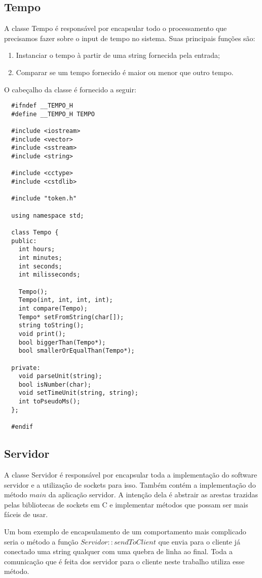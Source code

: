 \documentclass[12pt]{article}
\begin{document}
\subsection{Tempo}
A classe Tempo é responsável por encapsular todo o processamento que precisamos
fazer sobre o input de tempo no sistema. Suas principais funções são:

\begin{enumerate}
  \item Instanciar o tempo à partir de uma string fornecida pela entrada;
  \item Comparar se um tempo fornecido é maior ou menor que outro tempo.
\end{enumerate}

O cabeçalho da classe é fornecido a seguir:

\begin{verbatim}
  #ifndef __TEMPO_H
  #define __TEMPO_H TEMPO

  #include <iostream>
  #include <vector>
  #include <sstream>
  #include <string>

  #include <cctype>
  #include <cstdlib>

  #include "token.h"

  using namespace std;

  class Tempo {
  public:
    int hours;
    int minutes;
    int seconds;
    int milisseconds;

    Tempo();
    Tempo(int, int, int, int);
    int compare(Tempo);
    Tempo* setFromString(char[]);
    string toString();
    void print();
    bool biggerThan(Tempo*);
    bool smallerOrEqualThan(Tempo*);

  private:
    void parseUnit(string);
    bool isNumber(char);
    void setTimeUnit(string, string);
    int toPseudoMs();
  };

  #endif
\end{verbatim}

\subsection{Servidor}

A classe Servidor é responsável por encapsular toda a implementação do software
servidor e a utilização de sockets para isso. Também contém a implementação do
método $main$ da aplicação servidor. A intenção dela é abstrair as arestas
trazidas pelas bibliotecas de sockets em C e implementar métodos que possam ser
mais fáceis de usar.

Um bom exemplo de encapsulamento de um comportamento mais complicado seria o
método a função $Servidor::sendToClient$ que envia para o cliente já conectado
uma string qualquer com uma quebra de linha ao final. Toda a comunicação que é
feita dos servidor para o cliente neste trabalho utiliza esse método.
\end{document}
